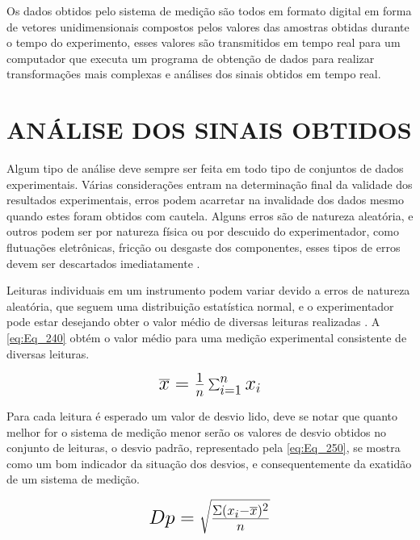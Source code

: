 Os dados obtidos pelo sistema de medição são todos em formato digital em forma de vetores unidimensionais compostos pelos valores das amostras obtidas durante o tempo do
experimento, esses valores são transmitidos em tempo real para um computador que executa um programa de obtenção de dados para realizar transformações mais complexas e
análises dos sinais obtidos em tempo real.

\section{ANÁLISE DOS SINAIS OBTIDOS}

Algum tipo de análise deve sempre ser feita em todo tipo de conjuntos de dados experimentais. Várias considerações entram na determinação final da validade dos resultados
experimentais, erros podem acarretar na invalidade dos dados mesmo quando estes foram obtidos com cautela. Alguns erros são de natureza aleatória, e outros podem ser por
natureza física ou por descuido do experimentador, como flutuações eletrônicas, fricção ou desgaste dos componentes, esses tipos de erros devem ser descartados imediatamente
\autocite{Hollman2011}.

Leituras individuais em um instrumento podem variar devido a erros de natureza aleatória, que seguem uma distribuição estatística normal, e o experimentador pode estar
desejando obter o valor médio de diversas leituras realizadas \autocite{Hollman2011}. A \autoref{eq:Eq_240} obtém o valor médio para uma medição experimental consistente
de diversas leituras.

\begin{equation}\label{eq:Eq_240}%
\mbox{\fontsize{17.28}{21.6}\selectfont\( %
\overline{x} = {\frac {1}{n}}\sum _{i=1}^{n}x_{i}
\)} %
\end{equation}

%
%
%

\hfill

Para cada leitura é esperado um valor de desvio lido, deve se notar que quanto melhor for o sistema de medição menor serão os valores de desvio obtidos no conjunto de
leituras, o desvio padrão, representado pela \autoref{eq:Eq_250}, se mostra como um bom indicador da situação dos desvios, e consequentemente da exatidão de um sistema de
medição.

\begin{equation}\label{eq:Eq_250}%
\mbox{\fontsize{17.28}{21.6}\selectfont\( %
Dp = \sqrt{\frac{\Sigma(x_i-\overline{x})^{2}}{n}}
\)} %
\end{equation}

